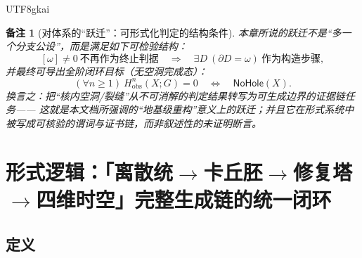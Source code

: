 \documentclass[12pt]{article}
\newtheorem{remark}{备注}[section]
\begin{document}
\begin{CJK*}{UTF8}{gkai}
\begin{remark}[对体系的“跃迁”：可形式化判定的结构条件]
本章所说的跃迁不是“多一个分支公设”，而是满足如下可检验结构：
\[
  [\omega]\neq 0\ \text{不再作为终止判据}
  \quad\Longrightarrow\quad
  \exists D\ (\partial D=\omega)\ \text{作为构造步骤},
\]
并最终可导出全阶闭环目标（无空洞完成态）：
\[
  (\forall n\ge 1)\ H^n_{\mathrm{obs}}(X;G)=0\quad\Longleftrightarrow\quad \mathsf{NoHole}(X).
\]
换言之：把“核内空洞/裂缝”从不可消解的判定结果转写为可生成边界的证据链任务——
这就是本文档所强调的“地基级重构”意义上的跃迁；并且它在形式系统中被写成可核验的谓词与证书链，而非叙述性的未证明断言。
\end{remark}

\section{\texorpdfstring{形式逻辑：「离散统$\to$卡丘胚$\to$修复塔$\to$四维时空」完整生成链的统一闭环}{形式逻辑：离散统->卡丘胚->修复塔->四维时空完整生成链的统一闭环}}
\label{sec:tex29-chain-discrete-kqemb-tower-4d}

\subsection{定义}
\label{subsec:tex29-chain-discrete-kqemb-tower-4d-def}


\end{CJK*}
\end{document}
